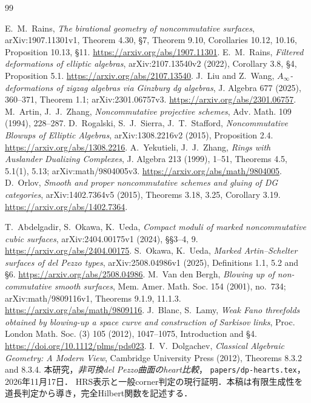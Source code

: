 \documentclass[11pt,a4paper]{ltjsarticle}
\theoremstyle{definition}\newtheorem{remark}[theorem]{注意}
\begin{document}
\begin{thebibliography}{99}

E.~M.~Rains, \emph{The birational geometry of noncommutative surfaces},
arXiv:1907.11301v1, Theorem 4.30, \S7, Theorem 9.10,
Corollaries 10.12, 10.16, Proposition 10.13, \S11.
\url{https://arxiv.org/abs/1907.11301}.
E.~M.~Rains, \emph{Filtered deformations of elliptic algebras},
arXiv:2107.13540v2 (2022), Corollary 3.8, \S4, Proposition 5.1.
\url{https://arxiv.org/abs/2107.13540}.
 J.~Liu and Z.~Wang,
\emph{$A_\infty$-deformations of zigzag algebras via Ginzburg dg algebras},
J. Algebra 677 (2025), 360--371, Theorem 1.1; arXiv:2301.06757v3.
\url{https://arxiv.org/abs/2301.06757}.
 M.~Artin, J.~J.~Zhang, \emph{Noncommutative projective schemes},
Adv. Math. 109 (1994), 228--287.
 D.~Rogalski, S.~J.~Sierra, J.~T.~Stafford,
\emph{Noncommutative Blowups of Elliptic Algebras},
arXiv:1308.2216v2 (2015), Proposition 2.4.
\url{https://arxiv.org/abs/1308.2216}.
 A.~Yekutieli, J.~J.~Zhang,
\emph{Rings with Auslander Dualizing Complexes},
J. Algebra 213 (1999), 1--51, Theorems 4.5, 5.1(1), 5.13;
arXiv:math/9804005v3. \url{https://arxiv.org/abs/math/9804005}.
 D.~Orlov,
\emph{Smooth and proper noncommutative schemes and gluing of DG categories},
arXiv:1402.7364v5 (2015), Theorems 3.18, 3.25, Corollary 3.19.
\url{https://arxiv.org/abs/1402.7364}.

 T.~Abdelgadir, S.~Okawa, K.~Ueda,
\emph{Compact moduli of marked noncommutative cubic surfaces},
arXiv:2404.00175v1 (2024), \S\S3--4, 9.
\url{https://arxiv.org/abs/2404.00175}.
 S.~Okawa, K.~Ueda,
\emph{Marked Artin--Schelter surfaces of del Pezzo types},
arXiv:2508.04986v1 (2025), Definitions 1.1, 5.2 and \S6.
\url{https://arxiv.org/abs/2508.04986}.
 M.~Van den Bergh,
\emph{Blowing up of non-commutative smooth surfaces},
Mem. Amer. Math. Soc. 154 (2001), no.~734;
arXiv:math/9809116v1, Theorems 9.1.9, 11.1.3.
\url{https://arxiv.org/abs/math/9809116}.
 J.~Blanc, S.~Lamy,
\emph{Weak Fano threefolds obtained by blowing-up a space curve and construction of Sarkisov links},
Proc. London Math. Soc. (3) 105 (2012), 1047--1075, Introduction and \S4.
\url{https://doi.org/10.1112/plms/pds023}.
 I.~V.~Dolgachev,
\emph{Classical Algebraic Geometry: A Modern View},
Cambridge University Press (2012), Theorems 8.3.2 and 8.3.4.
 本研究，\emph{非可換del Pezzo曲面のheart比較}，
\texttt{papers/dp-hearts.tex}，2026年11月17日．
HRS表示と一般corner判定の現行証明．本稿は有限生成性を道長判定から導き，完全Hilbert関数を記述する．

\end{thebibliography}
\end{document}
